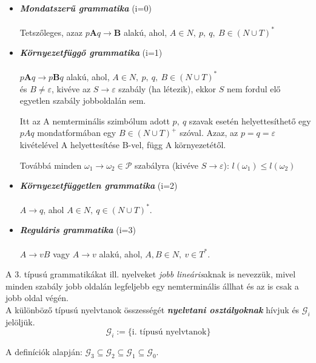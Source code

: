 \documentclass[12pt,margin=0px]{article}
\begin{document}
	\begin{itemize}
		\item \emph{\textbf{Mondatszerű grammatika}} (i=0)\\ \\
		Tetszőleges, azaz $p\textbf{A}q \rightarrow \textbf{B}$ alakú, ahol, $A \in N,\ p,\ q,\ B \in (N \cup T)^{*}$
		\item \emph{\textbf{Környezetfüggő grammatika}} (i=1)\\ \\
		$p\textbf{A}q \rightarrow p\textbf{B}q$ alakú, ahol, $A \in N,\ p,\ q,\ B \in (N \cup T)^{*}$\\
        és $B \neq \varepsilon$, kivéve az $S \rightarrow \varepsilon$ szabály (ha létezik), ekkor $S$ nem fordul elő egyetlen szabály jobboldalán sem.
        
        Itt az A nemterminális szimbólum adott $p,\ q$ szavak esetén helyettesíthető egy $pAq$ mondatformában egy $B \in (N \cup T)^{+}$ szóval. Azaz, az $p = q = \varepsilon$ kivételével A helyettesítése B-vel, függ A környezetétől.
        
        Továbbá minden $\omega_1 \to \omega_2 \in \mathcal{P}$ szabályra (kivéve $S \rightarrow \varepsilon$): $l(\omega_1) \leq l(\omega_2)$
		\item \emph{\textbf{Környezetfüggetlen grammatika}} (i=2)\\ \\
		$A \rightarrow q$, ahol $A \in N,\ q \in (N \cup T)^{*}$.\\
		\item \emph{\textbf{Reguláris grammatika}} (i=3)\\ \\
		$A \rightarrow vB$ vagy $A \rightarrow v$ alakú, ahol, $A,B\in N,\ v \in T^*$.
    \end{itemize}

    \noindent A 3. típusú grammatikákat ill. nyelveket \emph{jobb lineáris}aknak is nevezzük, mivel minden szabály jobb oldalán legfeljebb egy nemterminális állhat és az is csak a jobb oldal végén.\\

    \noindent A különböző típusú nyelvtanok összességét \textbf{\emph{nyelvtani osztályoknak}} hívjuk és $\mathcal{G}_{i}$ jelöljük.
    \[
        \mathcal{G}_{i} := \big\{\text{i. típusú nyelvtanok}\big\}
    \]

    \noindent A definíciók alapján: $\mathcal{G}_3 \subseteq \mathcal{G}_2 \subseteq \mathcal{G}_1 \subseteq \mathcal{G}_0$.\\
\end{document}
